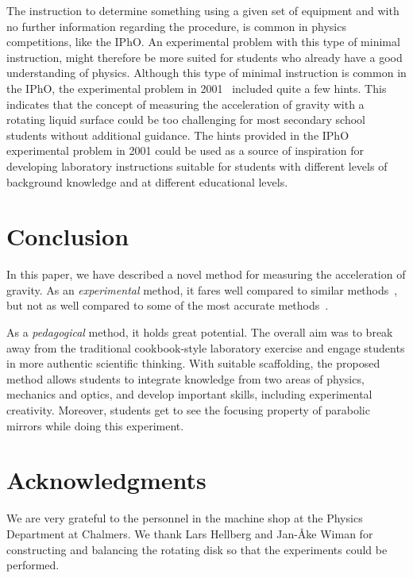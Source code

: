 \documentclass[12pt, a4paper, twocolumn]{article}
\begin{document}
The instruction to determine something using a given set of equipment
and with no further information regarding the procedure, is common in
physics competitions, like the IPhO. An experimental problem with this
type of minimal instruction, might therefore be more suited for
students who already have a good understanding of physics. Although
this type of minimal instruction is common in the IPhO, the
experimental problem in 2001~\cite{IPhO2001} included quite a few
hints. This indicates that the concept of measuring the acceleration
of gravity with a rotating liquid surface could be too challenging for
most secondary school students without additional guidance. The hints
provided in the IPhO experimental problem in 2001 could be used as a
source of inspiration for developing laboratory instructions suitable
for students with different levels of background knowledge and at
different educational levels. 

\section{Conclusion}

In this paper, we have described a novel method for measuring the acceleration of gravity. As an \emph{experimental} method, it fares well compared to similar methods~\cite{IPhO2001}, but not as well compared to some of the most accurate methods~\cite{Candela2001}. 

As a \emph{pedagogical} method, it holds great potential. The overall aim was to break away from the traditional cookbook-style laboratory exercise and engage students in more authentic scientific thinking. With suitable scaffolding, the proposed method allows students to integrate knowledge from two areas of physics, mechanics and optics, and develop important skills, including experimental creativity. Moreover, students get to see the focusing property of parabolic mirrors while doing this experiment.

\section*{Acknowledgments}

We are very grateful to the personnel in the machine shop at the
Physics Department at Chalmers. We thank Lars Hellberg and Jan-Åke
Wiman for constructing and balancing the rotating disk so that the
experiments could be performed. 



\end{document}
